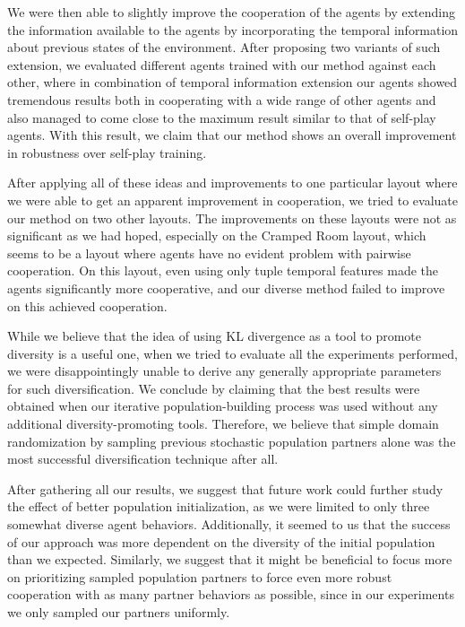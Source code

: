 We were then able to slightly improve the cooperation of the agents by extending the information available to the agents by incorporating the temporal information about previous states of the environment.
After proposing two variants of such extension, we evaluated different agents trained with our method against each other, where in combination of temporal information extension our agents showed tremendous results both in cooperating with a wide range of other agents and also managed to come close to the maximum result similar to that of self-play agents.
With this result, we claim that our method shows an overall improvement in robustness over self-play training.

After applying all of these ideas and improvements to one particular layout where we were able to get an apparent improvement in cooperation, we tried to evaluate our method on two other layouts.
The improvements on these layouts were not as significant as we had hoped, especially on the Cramped Room layout, which seems to be a layout where agents have no evident problem with pairwise cooperation.
On this layout, even using only tuple temporal features made the agents significantly more cooperative, and our diverse method failed to improve on this achieved cooperation.

While we believe that the idea of using KL divergence as a tool to promote diversity is a useful one, when we tried to evaluate all the experiments performed, we were disappointingly unable to derive any generally appropriate parameters for such diversification.
We conclude by claiming that the best results were obtained when our iterative population-building process was used without any additional diversity-promoting tools.
Therefore, we believe that simple domain randomization by sampling previous stochastic population partners alone was the most successful diversification technique after all.

After gathering all our results, we suggest that future work could further study the effect of better population initialization, as we were limited to only three somewhat diverse agent behaviors.
Additionally, it seemed to us that the success of our approach was more dependent on the diversity of the initial population than we expected.
Similarly, we suggest that it might be beneficial to focus more on prioritizing sampled population partners to force even more robust cooperation with as many partner behaviors as possible, since in our experiments we only sampled our partners uniformly.


